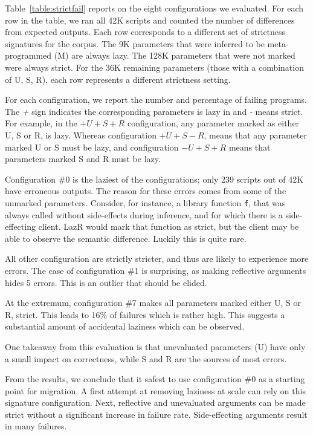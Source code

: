 \documentclass[review,nonacm,screen,acmsmall,anonymous=true]{acmart}
\renewcommand{\c}[1]{\lstinline |#1|\xspace}
\newcommand{\lazr}{{\sf LazR}\xspace}
\newcommand{\config}[1]{configuration \#{#1}}
\newcommand{\cconfig}[1]{Configuration \#{#1}}
\begin{document}
Table~\ref{table:strictfail} reports on the eight configurations we evaluated.
For each row in the table, we ran all 42K scripts and counted the number of
differences from expected outputs. Each row corresponds to a different set of
strictness signatures for the corpus. The 9K parameters that were inferred to be
meta-programmed (M) are always lazy. The 128K parameters that were not marked
were always strict. For the 36K remaining parameters (those with a combination
of U, S, R), each row represents a different strictness setting.

For each configuration, we report the number and percentage of failing programs.
The \emph{+} sign indicates the corresponding parameters is lazy in and \emph{-}
means strict. For example, in the $+U+S+R$ configuration, any parameter marked
as either U, S or R, is lazy. Whereas configuration $+U+S-R$, means that any
parameter marked U or S must be lazy, and configuration $-U+S+R$ means that
parameters marked S and R must be lazy.

\cconfig 0 is the laziest of the configurations; only 239 scripts out of 42K
have erroneous outputs. The reason for these errors comes from some of the
unmarked parameters. Consider, for instance, a library function \c f, that was
always called without side-effects during inference, and for which there is a
side-effecting client. \lazr would mark that function as strict, but the client
may be able to observe the semantic difference. Luckily this is quite rare.

All other configuration are strictly stricter, and thus are likely to experience
more errors. The case of \config 1 is surprising, as making reflective arguments
hides 5 errors. This is an outlier that should be elided.

At the extremum, \config 7 makes all parameters marked either U, S or R, strict.
This leads to 16\% of failures which is rather high. This suggests a substantial
amount of accidental laziness which can be observed.

One takeaway from this evaluation is that unevaluated parameters (U) have only a
small impact on correctness, while S and R are the sources of most errors.

From the results, we conclude that it safest to use \config 0 as a starting
point for migration. A first attempt at removing laziness at scale can rely on
this signature configuration. Next, reflective and unevaluated arguments can be
made strict without a significant increase in failure rate. Side-effecting
arguments result in many failures.
\end{document}
